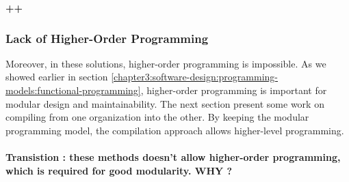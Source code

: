 \textbf{++}


\subsubsection{Lack of Higher-Order Programming}

Moreover, in these solutions, higher-order programming is impossible.
As we showed earlier in section \ref{chapter3:software-design:programming-models:functional-programming}, higher-order programming is important for modular design and maintainability.
The next section present some work on compiling from one organization into the other.
By keeping the modular programming model, the compilation approach allows higher-level programming. 

\paragraph{Transistion : these methods doesn't allow higher-order programming, which is required for good modularity. WHY ?}


\endinput

\subsection{Concurrency Theory} \label{chapter3:parallel-execution:concurrency-theory}

The mathematical models are a ground for all following work on concurrent programming, we briefly explain them in the next paragraphs.
There are two main formal models for concurrent computations.
The Actor Model of C. Hewitt and the Pi-calculus of R. Milner.
Based on these definitions, we explain the importance of determinism for correctness, and the reasons that made asynchronous message-passing prevail.


\subsubsection{Models}

\paragraph{Actor Model}


